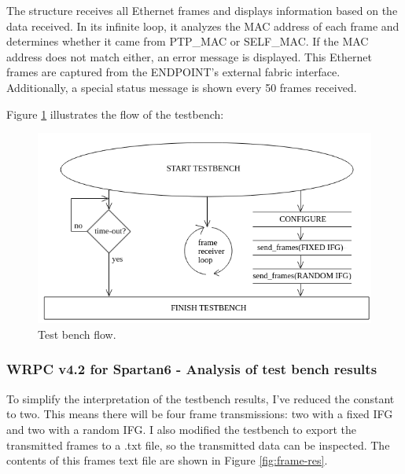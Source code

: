 \noindent The  structure receives all Ethernet frames and displays information based on the data received.
In its infinite loop, it analyzes the MAC address of each frame and determines whether it came from PTP\_MAC or SELF\_MAC.
If the MAC address does not match either, an error message is displayed.
This Ethernet frames are captured from the ENDPOINT’s external fabric interface. 
Additionally, a special status message is shown every 50 frames received.

\vspace{5mm}

\noindent Figure \ref{fig:tb-flow} illustrates the flow of the testbench:

\begin{figure}[H]
\centering
\includegraphics[width=14cm]{figures/tb_flow.png}
\caption{Test bench flow.}
\label{fig:tb-flow}
\end{figure}

\newpage 

\subsubsection{WRPC v4.2 for Spartan6 - Analysis of test bench results}

\noindent To simplify the interpretation of the testbench results, I’ve reduced the  constant to two.
This means there will be four frame transmissions: two with a fixed IFG and two with a random IFG.
I also modified the testbench to export the transmitted frames to a .txt file, so the transmitted data can be inspected.
The contents of this frames text file are shown in Figure \ref{fig:frame-res}.

